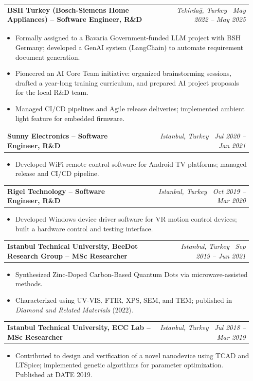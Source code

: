 \documentclass[10.5pt, letterpaper]{moderncv}
\makeatletter
\newcommand{\cvexp}[4]{%
  \vspace{-2pt}\par\noindent
  \begin{tabular*}{\textwidth}{@{}l@{\extracolsep{\fill}}r@{}}
    \textbf{#1} & \small\textit{#2 \textendash\ #3}\\
  \end{tabular*}\vspace{3pt}
  #4\vspace{5pt}%
}
\makeatother
\begin{document}
\cvexp{BSH Turkey (Bosch-Siemens Home Appliances) -- Software Engineer, R\&D}{Tekirda\u{g}, Turkey}{May 2022 -- May 2025}{
  \begin{itemize}
    \item Formally assigned to a Bavaria Government-funded LLM project with BSH Germany; developed a GenAI system (LangChain) to automate requirement document generation.
    \item Pioneered an AI Core Team initiative: organized brainstorming sessions, drafted a year-long training curriculum, and prepared AI project proposals for the local R\&D team.
    \item Managed CI/CD pipelines and Agile release deliveries; implemented ambient light feature for embedded firmware.
  \end{itemize}
}

\cvexp{Sunny Electronics -- Software Engineer, R\&D}{Istanbul, Turkey}{Jul 2020 -- Jan 2021}{
  \begin{itemize}
    \item Developed WiFi remote control software for Android TV platforms; managed release and CI/CD pipeline.
  \end{itemize}
}

\cvexp{Rigel Technology -- Software Engineer, R\&D}{Istanbul, Turkey}{Oct 2019 -- Mar 2020}{
  \begin{itemize}
    \item Developed Windows device driver software for VR motion control devices; built a hardware control and testing interface.
  \end{itemize}
}

\cvexp{Istanbul Technical University, BeeDot Research Group -- MSc Researcher}{Istanbul, Turkey}{Sep 2019 -- Jun 2021}{
  \begin{itemize}
    \item Synthesized Zinc-Doped Carbon-Based Quantum Dots via microwave-assisted methods.
    \item Characterized using UV-VIS, FTIR, XPS, SEM, and TEM; published in \textit{Diamond and Related Materials} (2022).
  \end{itemize}
}

\pagebreak
\cvexp{Istanbul Technical University, ECC Lab -- MSc Researcher}{Istanbul, Turkey}{Jul 2018 -- Mar 2019}{
  \begin{itemize}
    \item Contributed to design and verification of a novel nanodevice using TCAD and LTSpice; implemented genetic algorithms for parameter optimization. Published at DATE 2019.
  \end{itemize}
}
\end{document}
